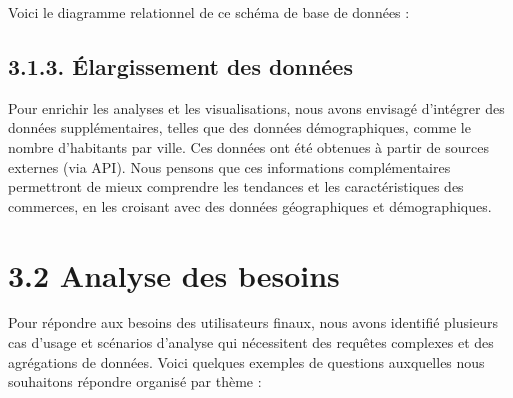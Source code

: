 Voici le diagramme relationnel de ce schéma de base de données :



\subsection*{3.1.3. Élargissement des données}

Pour enrichir les analyses et les visualisations, nous avons envisagé d’intégrer des données supplémentaires, telles que des données démographiques, comme le nombre d'habitants par ville.
Ces données ont été obtenues à partir de sources externes (via API).
Nous pensons que ces informations complémentaires permettront de mieux comprendre les tendances et les caractéristiques des commerces, en les croisant avec des données géographiques et démographiques.


\section*{3.2 Analyse des besoins}

Pour répondre aux besoins des utilisateurs finaux, nous avons identifié plusieurs cas d’usage et scénarios d’analyse qui nécessitent des requêtes complexes et des agrégations de données.
Voici quelques exemples de questions auxquelles nous souhaitons répondre organisé par thème :

